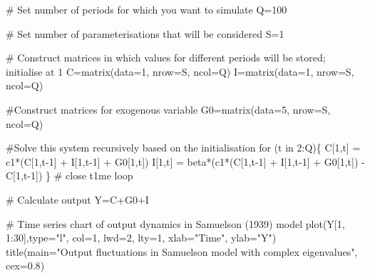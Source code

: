 \documentclass[
  letterpaper,
  DIV=11,
  numbers=noendperiod]{scrreprt}
\newenvironment{Shaded}{\begin{snugshade}}{\end{snugshade}}
\newcommand{\AttributeTok}[1]{\textcolor[rgb]{0.40,0.45,0.13}{#1}}
\newcommand{\CommentTok}[1]{\textcolor[rgb]{0.37,0.37,0.37}{#1}}
\newcommand{\ControlFlowTok}[1]{\textcolor[rgb]{0.00,0.23,0.31}{#1}}
\newcommand{\DecValTok}[1]{\textcolor[rgb]{0.68,0.00,0.00}{#1}}
\newcommand{\FloatTok}[1]{\textcolor[rgb]{0.68,0.00,0.00}{#1}}
\newcommand{\FunctionTok}[1]{\textcolor[rgb]{0.28,0.35,0.67}{#1}}
\newcommand{\NormalTok}[1]{\textcolor[rgb]{0.00,0.23,0.31}{#1}}
\newcommand{\OtherTok}[1]{\textcolor[rgb]{0.00,0.23,0.31}{#1}}
\newcommand{\SpecialCharTok}[1]{\textcolor[rgb]{0.37,0.37,0.37}{#1}}
\newcommand{\StringTok}[1]{\textcolor[rgb]{0.13,0.47,0.30}{#1}}
\begin{document}
\begin{Shaded}
\begin{Highlighting}[]
\CommentTok{\# Set number of periods for which you want to simulate}
\NormalTok{Q}\OtherTok{=}\DecValTok{100}

\CommentTok{\# Set number of parameterisations that will be considered}
\NormalTok{S}\OtherTok{=}\DecValTok{1}

\CommentTok{\# Construct matrices in which values for different periods will be stored; initialise at 1}
\NormalTok{C}\OtherTok{=}\FunctionTok{matrix}\NormalTok{(}\AttributeTok{data=}\DecValTok{1}\NormalTok{, }\AttributeTok{nrow=}\NormalTok{S, }\AttributeTok{ncol=}\NormalTok{Q)}
\NormalTok{I}\OtherTok{=}\FunctionTok{matrix}\NormalTok{(}\AttributeTok{data=}\DecValTok{1}\NormalTok{, }\AttributeTok{nrow=}\NormalTok{S, }\AttributeTok{ncol=}\NormalTok{Q)}

\CommentTok{\#Construct matrices for exogenous variable}
\NormalTok{G0}\OtherTok{=}\FunctionTok{matrix}\NormalTok{(}\AttributeTok{data=}\DecValTok{5}\NormalTok{, }\AttributeTok{nrow=}\NormalTok{S, }\AttributeTok{ncol=}\NormalTok{Q)}

\CommentTok{\#Solve this system recursively based on the initialisation}
\ControlFlowTok{for}\NormalTok{ (t }\ControlFlowTok{in} \DecValTok{2}\SpecialCharTok{:}\NormalTok{Q)\{}
\NormalTok{    C[}\DecValTok{1}\NormalTok{,t] }\OtherTok{=}\NormalTok{ c1}\SpecialCharTok{*}\NormalTok{(C[}\DecValTok{1}\NormalTok{,t}\DecValTok{{-}1}\NormalTok{] }\SpecialCharTok{+}\NormalTok{ I[}\DecValTok{1}\NormalTok{,t}\DecValTok{{-}1}\NormalTok{] }\SpecialCharTok{+}\NormalTok{ G0[}\DecValTok{1}\NormalTok{,t])}
\NormalTok{    I[}\DecValTok{1}\NormalTok{,t] }\OtherTok{=}\NormalTok{ beta}\SpecialCharTok{*}\NormalTok{(c1}\SpecialCharTok{*}\NormalTok{(C[}\DecValTok{1}\NormalTok{,t}\DecValTok{{-}1}\NormalTok{] }\SpecialCharTok{+}\NormalTok{ I[}\DecValTok{1}\NormalTok{,t}\DecValTok{{-}1}\NormalTok{] }\SpecialCharTok{+}\NormalTok{ G0[}\DecValTok{1}\NormalTok{,t]) }\SpecialCharTok{{-}}\NormalTok{ C[}\DecValTok{1}\NormalTok{,t}\DecValTok{{-}1}\NormalTok{])}
\NormalTok{  \} }\CommentTok{\# close t1me loop}

\CommentTok{\# Calculate output}
\NormalTok{Y}\OtherTok{=}\NormalTok{C}\SpecialCharTok{+}\NormalTok{G0}\SpecialCharTok{+}\NormalTok{I}

\CommentTok{\# Time series chart of output dynamics in Samuelson (1939) model}
\FunctionTok{plot}\NormalTok{(Y[}\DecValTok{1}\NormalTok{, }\DecValTok{1}\SpecialCharTok{:}\DecValTok{30}\NormalTok{],}\AttributeTok{type=}\StringTok{"l"}\NormalTok{, }\AttributeTok{col=}\DecValTok{1}\NormalTok{, }\AttributeTok{lwd=}\DecValTok{2}\NormalTok{, }\AttributeTok{lty=}\DecValTok{1}\NormalTok{, }\AttributeTok{xlab=}\StringTok{"Time"}\NormalTok{, }\AttributeTok{ylab=}\StringTok{"Y"}\NormalTok{) }
\FunctionTok{title}\NormalTok{(}\AttributeTok{main=}\StringTok{"Output fluctuations in Samuelson model with complex eigenvalues"}\NormalTok{, }\AttributeTok{cex=}\FloatTok{0.8}\NormalTok{)}
\end{Highlighting}
\end{Shaded}
\end{document}
